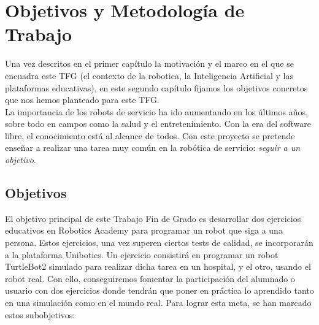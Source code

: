 \chapter{Objetivos y Metodología de Trabajo}
\label{cap:capitulo2}

Una vez descritos en el primer capítulo la motivación y el marco en el que se encuadra este TFG (el contexto de la robotica, la Inteligencia Artificial y las plataformas educativas), en este segundo capítulo fijamos los objetivos concretos que nos hemos planteado para este TFG.\\

La importancia de los robots de servicio ha ido aumentando en los últimos años, sobre todo en campos como la salud y el entretenimiento. Con la era del software libre, el conocimiento está al alcance de todos. Con este proyecto se pretende enseñar a realizar una tarea muy común en la robótica de servicio: \textit{seguir a un objetivo}.

\section{Objetivos}
\label{sec:objetivos}

El objetivo principal de este Trabajo Fin de Grado es desarrollar dos ejercicios educativos en Robotics Academy para programar un robot que siga a una persona. Estos ejercicios, una vez superen ciertos tests de calidad, se incorporarán a la plataforma Unibotics. Un ejercicio consistirá en programar un robot TurtleBot2 simulado para realizar dicha tarea en un hospital, y el otro, usando el robot real. Con ello, conseguiremos fomentar la participación del alumnado o usuario con dos ejercicios donde tendrán que poner en práctica lo aprendido tanto en una simulación como en el mundo real. Para lograr esta meta, se han marcado estos subobjetivos:


